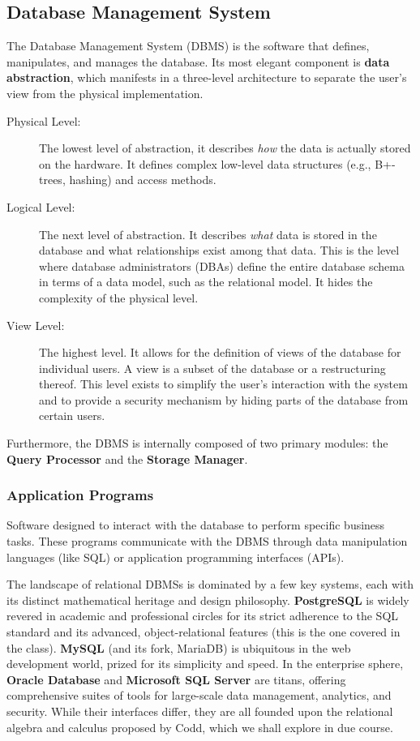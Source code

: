 \subsection{Database Management System}
The Database Management System (DBMS) is the software that defines, manipulates, and manages the database. Its most elegant component is \textbf{data abstraction}, which manifests in a three-level architecture to separate the user's view from the physical implementation.
\begin{description}
    \item[Physical Level:] The lowest level of abstraction, it describes \textit{how} the data is actually stored on the hardware. It defines complex low-level data structures (e.g., B+-trees, hashing) and access methods.
    \item[Logical Level:] The next level of abstraction. It describes \textit{what} data is stored in the database and what relationships exist among that data. This is the level where database administrators (DBAs) define the entire database schema in terms of a data model, such as the relational model. It hides the complexity of the physical level.
    \item[View Level:] The highest level. It allows for the definition of views of the database for individual users. A view is a subset of the database or a restructuring thereof. This level exists to simplify the user's interaction with the system and to provide a security mechanism by hiding parts of the database from certain users.
\end{description}
Furthermore, the DBMS is internally composed of two primary modules: the \textbf{Query Processor} and the \textbf{Storage Manager}.

\subsubsection{Application Programs}
Software designed to interact with the database to perform specific business tasks. These programs communicate with the DBMS through data manipulation languages (like SQL) or application programming interfaces (APIs).

The landscape of relational DBMSs is dominated by a few key systems, each with its distinct mathematical heritage and design philosophy. \textbf{PostgreSQL} is widely revered in academic and professional circles for its strict adherence to the SQL standard and its advanced, object-relational features (this is the one covered in the class). \textbf{MySQL} (and its fork, MariaDB) is ubiquitous in the web development world, prized for its simplicity and speed. In the enterprise sphere, \textbf{Oracle Database} and \textbf{Microsoft SQL Server} are titans, offering comprehensive suites of tools for large-scale data management, analytics, and security. While their interfaces differ, they are all founded upon the relational algebra and calculus proposed by Codd, which we shall explore in due course.

